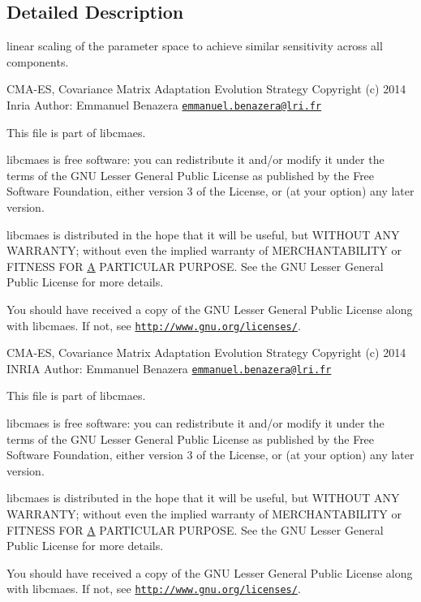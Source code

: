 \subsection{Detailed Description}
linear scaling of the parameter space to achieve similar sensitivity across all components. 

C\+M\+A-\/\+E\+S, Covariance Matrix Adaptation Evolution Strategy Copyright (c) 2014 Inria Author\+: Emmanuel Benazera \href{mailto:emmanuel.benazera@lri.fr}{\tt emmanuel.\+benazera@lri.\+fr}

This file is part of libcmaes.

libcmaes is free software\+: you can redistribute it and/or modify it under the terms of the G\+N\+U Lesser General Public License as published by the Free Software Foundation, either version 3 of the License, or (at your option) any later version.

libcmaes is distributed in the hope that it will be useful, but W\+I\+T\+H\+O\+U\+T A\+N\+Y W\+A\+R\+R\+A\+N\+T\+Y; without even the implied warranty of M\+E\+R\+C\+H\+A\+N\+T\+A\+B\+I\+L\+I\+T\+Y or F\+I\+T\+N\+E\+S\+S F\+O\+R \hyperlink{classA}{A} P\+A\+R\+T\+I\+C\+U\+L\+A\+R P\+U\+R\+P\+O\+S\+E. See the G\+N\+U Lesser General Public License for more details.

You should have received a copy of the G\+N\+U Lesser General Public License along with libcmaes. If not, see \href{http://www.gnu.org/licenses/}{\tt http\+://www.\+gnu.\+org/licenses/}.

C\+M\+A-\/\+E\+S, Covariance Matrix Adaptation Evolution Strategy Copyright (c) 2014 I\+N\+R\+I\+A Author\+: Emmanuel Benazera \href{mailto:emmanuel.benazera@lri.fr}{\tt emmanuel.\+benazera@lri.\+fr}

This file is part of libcmaes.

libcmaes is free software\+: you can redistribute it and/or modify it under the terms of the G\+N\+U Lesser General Public License as published by the Free Software Foundation, either version 3 of the License, or (at your option) any later version.

libcmaes is distributed in the hope that it will be useful, but W\+I\+T\+H\+O\+U\+T A\+N\+Y W\+A\+R\+R\+A\+N\+T\+Y; without even the implied warranty of M\+E\+R\+C\+H\+A\+N\+T\+A\+B\+I\+L\+I\+T\+Y or F\+I\+T\+N\+E\+S\+S F\+O\+R \hyperlink{classA}{A} P\+A\+R\+T\+I\+C\+U\+L\+A\+R P\+U\+R\+P\+O\+S\+E. See the G\+N\+U Lesser General Public License for more details.

You should have received a copy of the G\+N\+U Lesser General Public License along with libcmaes. If not, see \href{http://www.gnu.org/licenses/}{\tt http\+://www.\+gnu.\+org/licenses/}.

